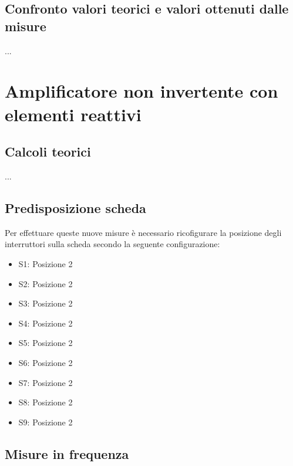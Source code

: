 \documentclass{article}
\begin{document}
\subsection{Confronto valori teorici e valori ottenuti dalle misure}
...

\section{Amplificatore non invertente con elementi reattivi}
\subsection{Calcoli teorici}
...
\subsection{Predisposizione scheda}
Per effettuare queste nuove misure è necessario ricofigurare la posizione degli interruttori sulla scheda secondo la seguente configurazione:
\begin{itemize}
	\item S1: Posizione 2
	\item S2: Posizione 2
	\item S3: Posizione 2
	\item S4: Posizione 2
	\item S5: Posizione 2
	\item S6: Posizione 2
	\item S7: Posizione 2
	\item S8: Posizione 2
	\item S9: Posizione 2
\end{itemize}

\subsection{Misure in frequenza}
\end{document}
